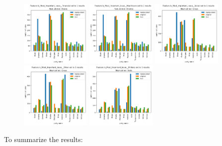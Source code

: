 \documentclass[12pt]{article}
\begin{document}
\begin{figure}[ht]
		\includegraphics[width=0.3\textwidth]{dramatic_feature/Is_Most_Important_Issue__Financial_set}
		\includegraphics[width=0.3\textwidth]{dramatic_feature/Is_Most_Important_Issue__Healthcare_set}
		\includegraphics[width=0.3\textwidth]{dramatic_feature/Is_Most_Important_Issue__Social_set}
		\includegraphics[width=0.3\textwidth]{dramatic_feature/Is_Most_Important_Issue__Other_set}
		\includegraphics[width=0.3\textwidth]{dramatic_feature/Is_Most_Important_Issue__Military_set}
\end{figure}

\newpage
To summarize the results:
\end{document}
